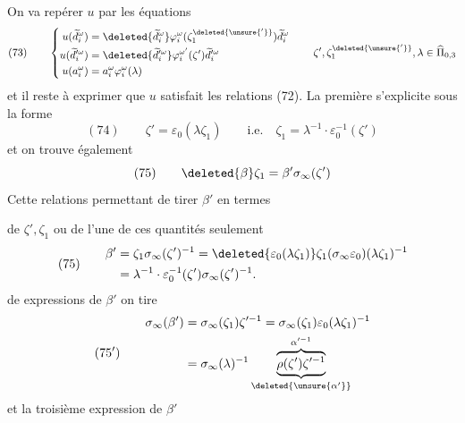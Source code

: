 On va repérer $u$ par les équations
\[
(73)\qquad\left\{\begin{aligned}
u(\widetilde d_i^\omega)&=\deleted{\widetilde d_i^\omega}\varphi_i^\omega(\zeta_1^{\deleted{\unsure{'}}})\widetilde d_i^\omega\\
u(\widetilde d_i^{\prime\omega})&=\deleted{\widetilde d_i^{\prime\omega}}\varphi_i^{\omega'}(\zeta')\widetilde d_i^{\prime\omega}\\
u(a_i^\omega)&=a_i^\omega\varphi_i^\omega(\lambda)
\end{aligned}\right.\qquad \zeta',\zeta_1^{\deleted{\unsure{'}}},\lambda\in\widehat\Pi_{0,3}
\]
et il reste à exprimer que $u$ satisfait les relations (72). La première s'explicite sous la forme
\[
(74)\qquad\zeta'=\varepsilon_0(\lambda\zeta_1)\qquad\text{i.e.}\quad\zeta_1=\lambda^{-1}\cdot\varepsilon_0^{-1}(\zeta')
\]
et on trouve également
\[
(75)\qquad\deleted{\beta}\zeta_1=\beta'\sigma_\infty(\zeta')
\]
Cette relations permettant de tirer $\beta'$ en termes

de $\zeta',\zeta_1$ ou de l'une de ces quantités seulement
\[
(75)\qquad\begin{aligned}
\beta'&=\zeta_1\sigma_\infty(\zeta')^{-1}=\deleted{\varepsilon_0(\lambda\zeta_1)}\zeta_1(\sigma_\infty\varepsilon_0)(\lambda\zeta_1)^{-1}\\
&=\lambda^{-1}\cdot\varepsilon_0^{-1}(\zeta')\sigma_\infty(\zeta')^{-1}.
\end{aligned}
\]
de   expressions de $\beta'$ on tire
\[
(75')\qquad\begin{aligned}
\sigma_\infty(\beta')&=\sigma_\infty(\zeta_1)\zeta'^{-1}=\sigma_\infty(\zeta_1)\varepsilon_0(\lambda\zeta_1)^{-1}\\
&=\sigma_\infty(\lambda)^{-1}\underbrace{\overbrace{\rho(\zeta')\zeta'^{-1}}^{\alpha'^{-1}}}_{\deleted{\unsure{\alpha'}}}
\end{aligned}
\]
et la troisième expression de $\beta'$ 

